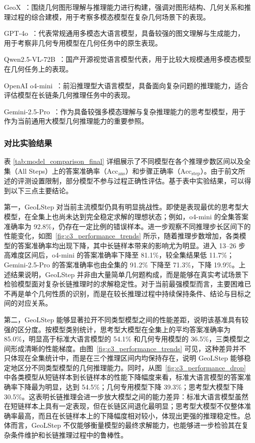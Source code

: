 GeoX~\cite{xia2024geox}：围绕几何图形理解与推理能力进行构建，强调对图形结构、几何关系和推理过程的综合建模，用于考察多模态模型在复杂几何场景下的表现。

GPT-4o~\cite{hurst2024gpt4o}：代表常规通用多模态大语言模型，具备较强的图文理解与生成能力，用于考察非几何专用模型在几何任务中的原生表现。

Qwen2.5-VL-72B~\cite{Qwen2.5-VL}：国产开源视觉语言模型代表，用于比较大规模通用多模态模型在几何任务上的表现。

OpenAI o4-mini~\cite{openai2025o3o4mini}：前沿推理型大语言模型，具备面向复杂问题的推理能力，适合评估模型在长链条几何推理任务中的表现。

Gemini-2.5-Pro~\cite{comanici2025gemini25}：作为具备较强多模态理解与复杂推理能力的思考型模型，用于作为当前通用大模型几何推理能力的重要参照。


\subsubsection{对比实验结果}
表 \ref{tab:model_comparison_final} 详细展示了不同模型在各个推理步数区间以及全集（All Steps）上的答案准确率（$\mathrm{Acc}_{\text{ans}}$）和步骤正确率（$\mathrm{Acc}_{\text{step}}$）。由于前文所述的评测设置限制，部分模型不参与过程正确性评估。基于表中实验结果，可以得到以下三点主要结论。

第一，GeoLStep 对当前主流模型仍具有明显挑战性。即使是表现最优的思考型大模型，在全集上也尚未达到完全稳定求解的理想状态；例如，o4-mini 的全集答案准确率为 92.8\%，仍存在一定比例的错误样本。进一步观察不同推理步长区间下的性能变化，如图~\ref{fig:c3_performance_trends} 所示，随着推理步数增加，各类模型的答案准确率均出现下降，其中长链样本带来的影响尤为明显。进入 13--26 步高难度区间后，o4-mini 的答案准确率下降至 81.1\%，较全集结果低 11.7\%；Gemini-2.5-Pro 的答案准确率也由全集的 91.2\% 下降至 71.3\%，下降 19.9\%。上述结果说明，GeoLStep 并非由大量简单几何题构成，而是能够在真实考试场景下检验模型面对复杂长链推理时的求解稳定性。对于当前最强模型而言，主要困难已不再是单个几何性质的识别，而是在较长推理过程中持续保持条件、结论与目标之间的对应关系。

第二，GeoLStep 能够显著拉开不同类型模型之间的性能差距，说明该基准具有较强的区分度。按模型类别统计，思考型大模型在全集上的平均答案准确率为 85.0\%，明显高于标准大语言模型的 54.1\% 和几何专用模型的 36.5\%，三类模型之间形成清晰的性能梯度。由图~\ref{fig:c3_performance_trends} 可见，这种差异并不只体现在全集统计中，而是在三个推理区间内均保持存在，说明 GeoLStep 能够稳定地区分不同类型模型的几何推理能力。同时，从图~\ref{fig:c3_performance_drop} 中各类模型从短链样本到长链样本的性能下降幅度来看，标准大语言模型的答案准确率下降最为明显，达到 54.5\%；几何专用模型下降 39.3\%；思考型大模型下降 30.5\%。这表明长链推理会进一步放大模型之间的能力差异：标准大语言模型虽然在短链样本上具有一定表现，但在长链区间退化最明显；思考型大模型不仅整体准确率最高，而且在长链样本上的下降幅度相对较小，体现出更强的推理稳定性。总体而言，GeoLStep 不仅能够衡量模型的最终求解能力，也能够进一步检验其在复杂条件维护和长链推理过程中的鲁棒性。

